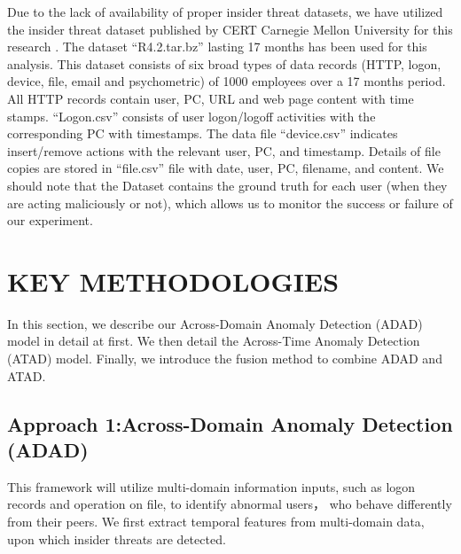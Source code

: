 \documentclass[conference]{IEEEtran}
\begin{document}
Due to the lack of availability of proper insider threat datasets, we have utilized the insider threat dataset published by CERT Carnegie Mellon University for this research \cite{b17}. The dataset ``R4.2.tar.bz'' lasting 17 months has been used for this analysis. This dataset consists of six broad types of data records (HTTP, logon, device, file, email and psychometric) of 1000 employees over a 17 months period. All HTTP records contain user, PC, URL and web page content with time stamps. “Logon.csv” consists of user logon/logoff activities with the corresponding PC with timestamps. The data file “device.csv” indicates insert/remove actions with the relevant user, PC, and timestamp. Details of file copies are stored in “file.csv” file with date, user, PC, filename, and content. We should note that the Dataset contains the ground truth for each user (when they are acting maliciously or not), which allows us to monitor the success or failure of our experiment.

\section{KEY METHODOLOGIES}
In this section, we describe our Across-Domain Anomaly Detection (ADAD) model in detail at first. We then detail the Across-Time Anomaly Detection (ATAD) model. Finally, we introduce the fusion method to combine ADAD and ATAD.

\subsection{Approach 1:Across-Domain Anomaly Detection (ADAD)}\label{AA}
This framework will utilize multi-domain information inputs, such as logon records and operation on file, to identify abnormal users， who behave differently from their peers. We first extract temporal features from multi-domain data, upon which insider threats are detected.

\end{document}
